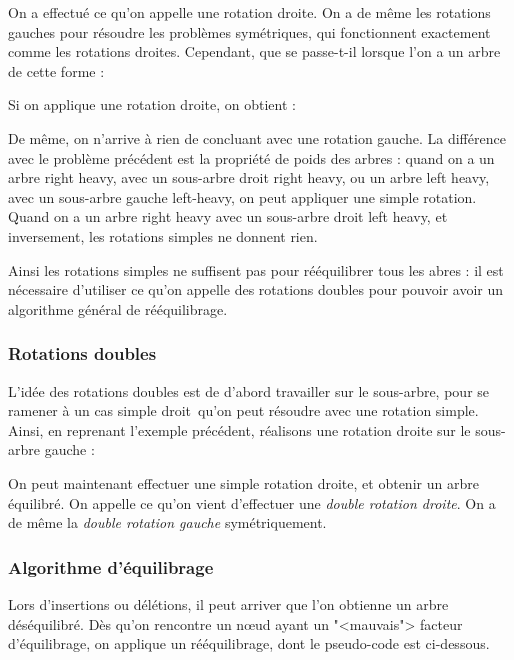\documentclass{article}
\begin{document}

On a effectué ce qu'on appelle une rotation droite. On a de même les rotations gauches pour résoudre les problèmes symétriques, qui fonctionnent exactement comme les rotations droites. Cependant, que se passe-t-il lorsque l'on a un arbre de cette forme :


Si on applique une rotation droite, on obtient :


De même, on n'arrive à rien de concluant avec une rotation gauche. La différence avec le problème précédent est la propriété de poids des arbres : quand on a un arbre right heavy, avec un sous-arbre droit right heavy, ou un arbre left heavy, avec un sous-arbre gauche left-heavy, on peut appliquer une simple rotation. Quand on a un arbre right heavy avec un sous-arbre droit left heavy, et inversement, les rotations simples ne donnent rien.

Ainsi les rotations simples ne suffisent pas pour rééquilibrer tous les abres : il est nécessaire d'utiliser ce qu'on appelle des rotations doubles pour pouvoir avoir un algorithme général de rééquilibrage.

\subsubsection{Rotations doubles}
L'idée des rotations doubles est de d'abord travailler sur le sous-arbre, pour se ramener à un cas simple \guillemotleft droit\guillemotright\ qu'on peut résoudre avec une rotation simple. Ainsi, en reprenant l'exemple précédent, réalisons une rotation droite sur le sous-arbre gauche :


On peut maintenant effectuer une simple rotation droite, et obtenir un arbre équilibré. On appelle ce qu'on vient d'effectuer une \textit{double rotation droite}. On a de même la \textit{double rotation gauche} symétriquement.

\subsubsection{Algorithme d'équilibrage}
Lors d'insertions ou délétions, il peut arriver que l'on obtienne un arbre déséquilibré. Dès qu'on rencontre un n\oe ud ayant un "<mauvais"> facteur d'équilibrage,
on applique un rééquilibrage, dont le pseudo-code est ci-dessous.
\end{document}
